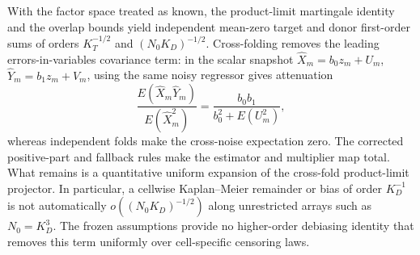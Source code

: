 With the factor space treated as known, the product-limit martingale identity and the overlap bounds yield independent mean-zero target and donor first-order sums of orders \(K_T^{-1/2}\) and \((N_0K_D)^{-1/2}\).  Cross-folding removes the leading errors-in-variables covariance term: in the scalar snapshot \(\widehat X_m=b_0z_m+U_m\), \(\widehat Y_m=b_1z_m+V_m\), using the same noisy regressor gives attenuation
\[
 \frac{E(\widehat X_m\widehat Y_m)}{E(\widehat X_m^2)}
 =\frac{b_0b_1}{b_0^2+E(U_m^2)},
\]
whereas independent folds make the cross-noise expectation zero.  The corrected positive-part and fallback rules make the estimator and multiplier map total.  What remains is a quantitative uniform expansion of the cross-fold product-limit projector.  In particular, a cellwise Kaplan--Meier remainder or bias of order \(K_D^{-1}\) is not automatically \(o((N_0K_D)^{-1/2})\) along unrestricted arrays such as \(N_0=K_D^3\).  The frozen assumptions provide no higher-order debiasing identity that removes this term uniformly over cell-specific censoring laws.